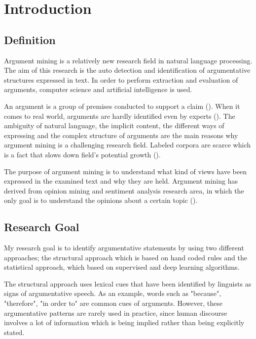 \chapter{Introduction}

\label{Chapter1}

\section{Definition} 

Argument mining is a relatively new research field in natural language processing. The aim of this research is the auto detection and identification of argumentative structures expressed in text. In order to perform extraction and evaluation of arguments, computer science and artificial intelligence is used. \par

An argument is a group of premises conducted to support a claim (\cite{Palau2009}). When it comes to real world, arguments are hardly identified even by experts (\cite{Lippi2015}). The ambiguity of natural language, the implicit content, the different ways of expressing and the complex structure of arguments are the main reasons why argument mining is a challenging research field. Labeled corpora are scarce which is a fact that slows down field's potential growth (\cite{Lippi2015}). \par

The purpose of argument mining is to understand what kind of views have been expressed in the examined text and why they are held. Argument mining has derived from opinion mining and sentiment analysis  research area, in which the only goal is to understand the opinions about a certain topic (\cite{Lawrence2015}). \par

\section{Research Goal}
 My research goal is to identify argumentative statements by using two different approaches; the structural approach which is based on hand coded rules and the statistical approach, which based on supervised and deep learning algorithms. \par
 
 The structural approach uses lexical cues that have been identified by linguists as signs of argumentative speech. As an example, words such as "because", "therefore", "in order to" are common cues of arguments. However, these argumentative patterns are rarely used in practice,	since human discourse involves a lot of information which is being implied rather than being explicitly stated. \par
 
